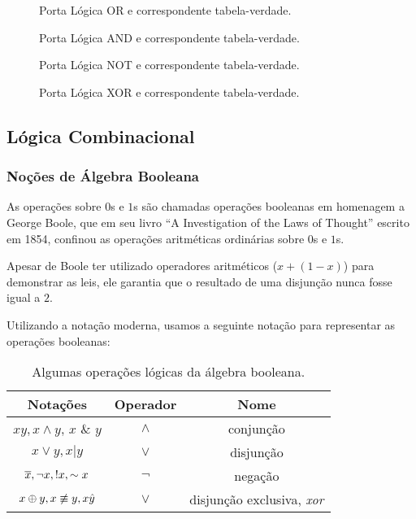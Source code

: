 \def\ltruthtable{ e correspondente tabela-verdade}

\begin{figure}[ht]
  \centering
  
  \caption{Porta Lógica OR \ltruthtable.}
  \label{fig:or:gate}
\end{figure}

\begin{figure}[ht]
  \centering
  
  \caption{Porta Lógica AND \ltruthtable.}
  \label{fig:and:gate}
\end{figure}

\begin{figure}[ht]
  \centering
  
  \caption{Porta Lógica NOT \ltruthtable.}
  \label{fig:not:gate}
\end{figure}
          
\begin{figure}[ht]
  \centering
  
  \label{fig:xor:gate}
  \caption{Porta Lógica XOR \ltruthtable.}
\end{figure}


\subsection{Lógica Combinacional}

\subsubsection{Noções de Álgebra Booleana}

As operações sobre $0$s e $1$s são chamadas operações booleanas em
homenagem a George Boole, que em seu livro ``A Investigation of the
Laws of Thought'' escrito em 1854, confinou as operações aritméticas
ordinárias sobre $0$s e $1$s.

Apesar de Boole ter utilizado operadores aritméticos ($x+(1-x)$) para demonstrar
as leis, ele garantia que o resultado de uma disjunção nunca fosse
igual a $2$.

Utilizando a notação moderna, usamos a seguinte notação para
representar as operações booleanas:

\begin{table}[ht]
  \centering
  \begin{tabular}{c|c|c}\hline
  \bf Notações &\bf Operador &\bf Nome \\\hline
  $xy, x\land y$, $x$ \& $y$ & $\land$ & conjunção \\
  $x\lor y, x|y$ & $\lor$ & disjunção \\
  $\overline{x}, \lnot x, !x, \sim x$ & $\lnot$ & negação \\
  $x\oplus y, x\not\equiv y,x\hat y$ & $\lor$ &
  disjunção exclusiva, {\em xor}\\\hline
\end{tabular}

\label{tab:bool:op}
\caption{Algumas operações lógicas da álgebra booleana.}
\end{table}

